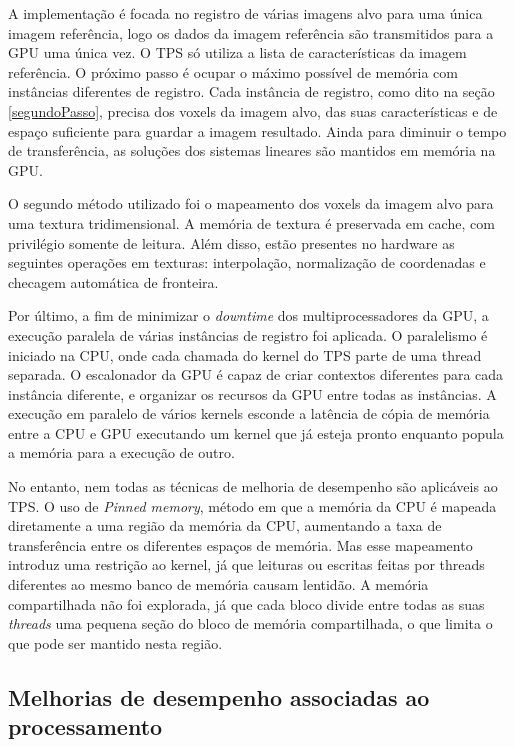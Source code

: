 A implementação é focada no registro de várias imagens alvo para uma única
imagem referência, logo os dados da imagem referência são transmitidos para a
GPU uma única vez. O TPS só utiliza a lista de características da imagem referência.
O próximo passo é ocupar o máximo possível de memória com instâncias diferentes
de registro. Cada instância de registro, como dito na seção \ref{segundoPasso},
precisa dos voxels da imagem alvo, das suas características e de espaço suficiente
para guardar a imagem resultado. Ainda para diminuir o tempo de transferência,
as soluções dos sistemas lineares são mantidos em memória na GPU.

O segundo método utilizado foi o mapeamento dos voxels da imagem alvo para uma
textura tridimensional. A memória de textura é preservada em cache, com privilégio
somente de leitura. Além disso, estão presentes no hardware as seguintes operações
em texturas: interpolação, normalização de coordenadas e checagem automática de
fronteira.

Por último, a fim de minimizar o \textit{downtime} dos multiprocessadores da GPU, a
execução paralela de várias instâncias de registro foi aplicada. O paralelismo
é iniciado na CPU, onde cada chamada do kernel do TPS parte de uma thread separada.
O escalonador da GPU é capaz de criar contextos diferentes para cada instância
diferente, e organizar os recursos da GPU entre todas as instâncias. A execução
em paralelo de vários kernels esconde a latência de cópia de memória entre a
CPU e GPU executando um kernel que já esteja pronto enquanto popula a memória
para a execução de outro.

No entanto, nem todas as técnicas de melhoria de desempenho são aplicáveis ao
TPS. O uso de \textit{Pinned memory}, método em que a memória da CPU é mapeada
diretamente a uma região da memória da CPU, aumentando a taxa de transferência entre
os diferentes espaços de memória. Mas esse mapeamento introduz uma restrição ao
kernel, já que leituras ou escritas feitas por threads diferentes ao mesmo banco
de memória causam lentidão. A memória compartilhada não foi explorada, já que
cada bloco divide entre todas as suas \textit{threads} uma pequena seção do
bloco de memória compartilhada, o que limita o que pode ser mantido nesta região.

\subsection{Melhorias de desempenho associadas ao processamento}

